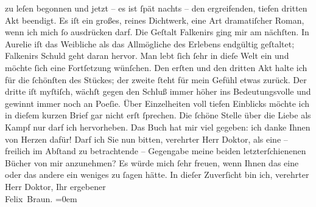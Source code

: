\begin{ledgroupsized}[t]{13cm}
               zu leſen begonnen und jetzt – es ist ſpät nachts – den ergreifenden, tiefen dritten
               Akt beendigt.\pend
           \pstart
           Es iſt ein großes, reines Dichtwerk, eine Art dramatiſcher Roman, wenn ich mich ſo
               ausdrücken darf. Die Geſtalt Falkenirs ging mir am nächſten. In Aurelie iſt das Weibliche als das Allmögliche des Erlebens
               endgültig geſtaltet; Falkenirs
               Schuld geht daran hervor. Man lebt ſich ſehr in dieſe Welt ein und möchte ſich eine
               Fortſetzung wün{\pb}ſchen. Den erſten und den dritten Akt
               halte ich für die ſchönſten des Stückes; der zweite ſteht für mein Gefühl etwas
               zurück. Der dritte iſt myſtiſch, wächſt gegen den Schluß immer höher ins
               Bedeutungsvolle und gewinnt immer noch an Poeſie. Über Einzelheiten voll tiefen
               Einblicks möchte ich in dieſem kurzen Brief gar nicht erſt ſprechen. Die ſchöne
               Stelle über die Liebe als Kampf nur darf ich hervorheben. Das Buch hat mir viel gegeben: ich danke Ihnen
               von Herzen dafür!\pend
           \pstart
           Darf ich Sie nun bitten, verehrter Herr Doktor, als eine – freilich im Abſtand zu
               betrachtende – Gegengabe meine beiden letzterſchienenen Bücher von mir anzunehmen? Es
               würde mich ſehr freuen, wenn Ihnen das eine oder das andere ein weniges zu ſagen
               hätte.\pend
           \pstart
           In dieſer Zuverſicht bin ich, verehrter Herr Doktor, Ihr ergebener{\\[\baselineskip]}\spacefill\mbox{Felix Braun.}\pend
           \leftskip=0em{}
         
         \endnumbering{}\end{ledgroupsized}  \newcommand{\dateiname}{L02415}\newcommand{\titel}{Felix Braun an Arthur Schnitzler, 2. 10. 1924}\newcommand{\editorInnen}{Martin Anton Müller und Gerd-Hermann Susen}
      